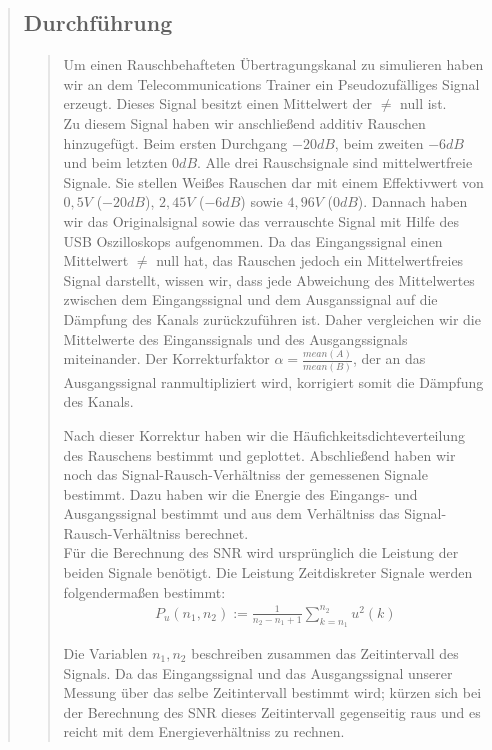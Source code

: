 \begin{quote}
    \subsection{Durchführung}
    \begin{quote}
        Um einen Rauschbehafteten Übertragungskanal zu simulieren haben wir an dem Telecommunications Trainer ein
        Pseudozufälliges Signal erzeugt. Dieses Signal besitzt einen Mittelwert der $\neq$ null ist.\\
        Zu diesem Signal haben wir anschließend additiv Rauschen hinzugefügt. Beim ersten Durchgang $-20dB$, beim
        zweiten $-6dB$ und beim letzten $0dB$. Alle drei Rauschsignale sind
        mittelwertfreie Signale. Sie stellen Weißes Rauschen dar mit einem Effektivwert von $0,5 V$ ($-20dB$), 
        $2,45V$ ($-6dB$)  sowie $4,96 V$ ($0 dB$).
        Dannach haben wir das Originalsignal sowie das verrauschte Signal mit Hilfe des USB Oszilloskops aufgenommen. 
        Da das Eingangssignal einen Mittelwert $\neq$ null hat, das Rauschen jedoch ein Mittelwertfreies Signal
        darstellt, wissen wir, dass jede Abweichung des Mittelwertes zwischen dem Eingangssignal und dem Ausganssignal
        auf die Dämpfung des Kanals zurückzuführen ist. Daher vergleichen wir die Mittelwerte des Einganssignals und des
        Ausgangssignals miteinander. Der Korrekturfaktor $\alpha = \frac{mean(A)}{mean(B)}$, der an das Ausgangssignal
        ranmultipliziert wird, korrigiert somit die Dämpfung des Kanals.\vspace{1em}
        
        Nach dieser Korrektur haben wir die Häufichkeitsdichteverteilung des Rauschens bestimmt und geplottet.
        Abschließend haben wir noch das Signal-Rausch-Verhältniss der gemessenen Signale bestimmt. Dazu haben wir die Energie des
        Eingangs- und Ausgangssignal bestimmt und aus dem Verhältniss das
        Signal-Rausch-Verhältniss berechnet.\\
        Für die Berechnung des SNR wird ursprünglich die Leistung der beiden Signale benötigt. Die Leistung
        Zeitdiskreter Signale werden folgendermaßen bestimmt:
        \begin{equation*}
            \begin{split}
                P_u(n_1, n_2) := \frac{1}{n_2 - n_1 + 1} \sum_{k=n_1}^{n_2} u^2 (k)
            \end{split}
        \end{equation*}
        
        Die Variablen $n_1,n_2$ beschreiben zusammen das Zeitintervall des Signals. Da das Eingangssignal und das
        Ausgangssignal unserer Messung über das selbe Zeitintervall bestimmt
        wird; kürzen sich bei der Berechnung des SNR dieses Zeitintervall gegenseitig raus und es reicht mit dem 
        Energieverhältniss zu rechnen.\\


\end{quote}
\end{quote}

